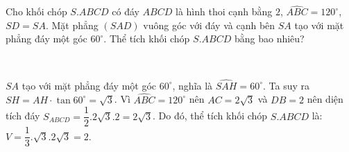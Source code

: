 \begin{tcolorbox}
\begin{bt}
Cho khối chóp $S.ABCD$ có đáy $ABCD$ là hình thoi cạnh bằng $2$, $\widehat{ABC} = 120^\circ$, $SD = SA$. Mặt phẳng $(SAD)$ vuông góc với đáy và cạnh bên $SA$ tạo với mặt phẳng đáy một góc $60^\circ$. Thể tích khối chóp $S.ABCD$ bằng bao nhiêu?
\end{bt}
\begin{sol}\textcolor{white}{.}\\
\begin{minipage}{0.65\textwidth}
$SA$ tạo với mặt phẳng đáy một góc $60^{\circ}$, nghĩa là $\widehat{SAH}=60^{\circ}$. Ta suy ra $SH=AH\cdot \tan{60^{\circ}}=\sqrt{3}$. Vì $\widehat{ABC}=120^{\circ}$ nên $AC=2\sqrt{3}$ và $DB=2$ nên diện tích đáy $S_{ABCD}=\dfrac{1}{2}.2\sqrt{3}.2=2\sqrt{3}$. Do đó, thể tích khối chóp $S.ABCD$ là: $V=\dfrac{1}{3}.\sqrt{3}.2\sqrt{3}=2.$
\end{minipage}
\begin{minipage}{0.4\textwidth}
\end{minipage}
\end{sol}
\end{tcolorbox}
